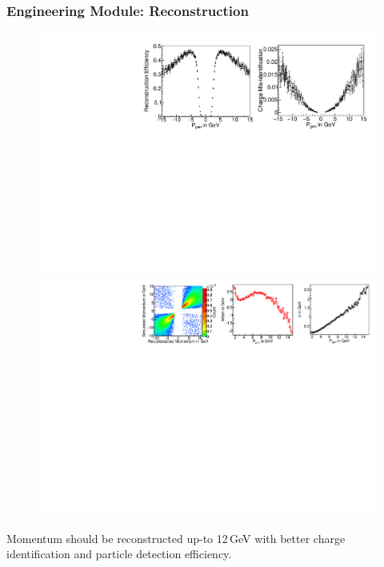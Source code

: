 \documentclass{beamer}
\begin{document}
\begin{frame}
  \frametitle{Engineering Module: Reconstruction}
  \vspace*{-9pt}
  \begin{figure}[h!]
    \includegraphics[width=0.7\linewidth]{GMA_effi_misId_20Layer_EM.pdf}
    \includegraphics[width=1.\linewidth]{GMA_response_mean_sigma_20Layer_EM.pdf}
  \end{figure}
  \vspace*{-9pt}
  Momentum should be reconstructed up-to 12\,GeV
  with better charge identification and particle detection efficiency.
\end{frame}
\end{document}
